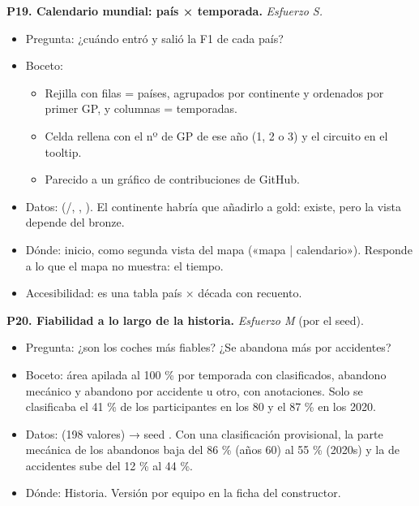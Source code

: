\textbf{P19. Calendario mundial: país × temporada.} \emph{Esfuerzo S.}

\begin{itemize}
\item Pregunta: ¿cuándo entró y salió la F1 de cada país?
\item Boceto:
\begin{itemize}
\item Rejilla con filas = países, agrupados por continente y ordenados por primer GP, y columnas = temporadas.
\item Celda rellena con el nº de GP de ese año (1, 2 o 3) y el circuito en el tooltip.
\item Parecido a un gráfico de contribuciones de GitHub.
\end{itemize}
\item Datos:  (/, , ). El continente habría que añadirlo a gold:  existe, pero la vista depende del bronze.
\item Dónde: inicio, como segunda vista del mapa («mapa | calendario»). Responde a lo que el mapa no muestra: el tiempo.
\item Accesibilidad: es una tabla país × década con recuento.
\end{itemize}

\textbf{P20. Fiabilidad a lo largo de la historia.} \emph{Esfuerzo M} (por el seed).

\begin{itemize}
\item Pregunta: ¿son los coches más fiables? ¿Se abandona más por accidentes?
\item Boceto: área apilada al 100 \% por temporada con clasificados, abandono mecánico y abandono por accidente u otro, con anotaciones. Solo se clasificaba el 41 \% de los participantes en los 80 y el 87 \% en los 2020.
\item Datos:  (198 valores) → seed . Con una clasificación provisional, la parte mecánica de los abandonos baja del 86 \% (años 60) al 55 \% (2020s) y la de accidentes sube del 12 \% al 44 \%.
\item Dónde: Historia. Versión por equipo en la ficha del constructor.
\end{itemize}

